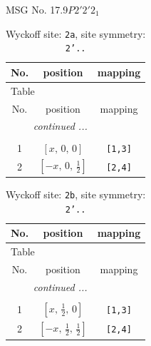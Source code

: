 \documentclass[fleqn,8pt]{jsarticle}
\begin{document}
\setcounter{MaxMatrixCols}{32}

\renewcommand{\tablename}{Table~}
\renewcommand{\figurename}{Figure~}
\begin{center}
\LARGE
MSG No. 17.9\quad$P2'2'2_{1}$
\end{center}
\renewcommand{\arraystretch}{1.2}
\begin{longtable}{ccc}
\caption{Wyckoff site: {\tt 2a}, site symmetry: {\tt 2'..}}
 \\
 \hline \hline
No. & position & mapping \\ \hline \endfirsthead

\multicolumn{2}{l}{\tablename\ \thetable{}} \\
 \hline \hline
No. & position & mapping \\ \hline \endhead

 \hline \hline
\multicolumn{2}{r}{\footnotesize\it continued ...} \\ \endfoot

 \hline \hline
\multicolumn{2}{r}{} \\ \endlastfoot

1 & $\left[ x,\, 0,\, 0 \right]$ & {\tt [1,3]} \\ \hline
2 & $\left[ - x,\, 0,\, \frac{1}{2} \right]$ & {\tt [2,4]} \\
\end{longtable}
\renewcommand{\arraystretch}{1.2}
\begin{longtable}{ccc}
\caption{Wyckoff site: {\tt 2b}, site symmetry: {\tt 2'..}}
 \\
 \hline \hline
No. & position & mapping \\ \hline \endfirsthead

\multicolumn{2}{l}{\tablename\ \thetable{}} \\
 \hline \hline
No. & position & mapping \\ \hline \endhead

 \hline \hline
\multicolumn{2}{r}{\footnotesize\it continued ...} \\ \endfoot

 \hline \hline
\multicolumn{2}{r}{} \\ \endlastfoot

1 & $\left[ x,\, \frac{1}{2},\, 0 \right]$ & {\tt [1,3]} \\ \hline
2 & $\left[ - x,\, \frac{1}{2},\, \frac{1}{2} \right]$ & {\tt [2,4]} \\
\end{longtable}
\renewcommand{\arraystretch}{1.2}
\end{document}
